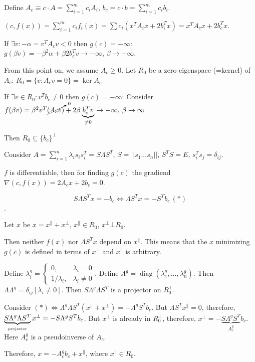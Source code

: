 \documentclass[a4paper]{article}
\DeclareMathOperator{\diag}{diag}
\begin{document}
Define $A_c\equiv c\cdot A=\sum\limits_{i=1}^m c_iA_i$, $b_c=c\cdot b=\sum\limits_{i=1}^m c_ib_i$.

$(c,f(x))=\sum\limits_{i=1}^m c_i f_i(x)=\sum c_i (x^TA_ix+2b_i^Tx)=x^TA_cx+2b_c^Tx$.

If $\exists v\colon -\alpha=v^TA_cv<0$ then $g(c)=-\infty$:
$g(\beta v)=-\beta^2\alpha+\beta 2b_c^Tv\to-\infty,\,\beta\to+\infty$.

From this point on, we assume $A_c\geqslant 0$. Let $R_0$ be a zero eigenspace (=kernel) of $A_c$: $R_0=\{v\colon A_cv=0\}=\ker A_c$

If $\exists v\in R_0\colon v^Tb_c\neq 0$ then $g(c)=-\infty$: Consider $f(\beta v)=\beta^2 v^T\cancelto{0}{(A_cv)}+2\beta \underbrace{b_c^Tv}_{\neq 0}\to-\infty,\, \beta\to\infty$

Then $R_0\subseteq \{b_c\}^\bot$

Consider $A=\sum\limits_{i=1}^n \lambda_i s_is_i^T=S\Lambda S^T$, $S=||s_1 ... s_n ||$, $S^TS=E$, $s_i^Ts_j=\delta_{ij}$.

$f$ is differentiable, then for finding $g(c)$ the gradiend $\nabla (c,f(x))=2A_cx+2b_c=0$.

$$S\Lambda S^Tx=-b_c\Leftrightarrow \Lambda S^Tx=-S^Tb_c\, (*)$$.

Let $x$ be $x=x^{\parallel}+x^\bot$, $x^{\parallel}\in R_0$, $x^\bot \bot R_0$.

Then neither $f(x)$ nor $\Lambda S^T x$ depend on $x^{\parallel}$. This means that the $x$ minimizing $g(c)$ is defined in terms of $x^{\bot}$ and $x^{\parallel}$ is arbitrary.

Define $\lambda^g_i=\begin{cases}
0,&\lambda_i=0\\
1/\lambda_i,&\lambda_i\neq 0
\end{cases}$. Define $\Lambda^g=\diag(\lambda^g_1,...,\lambda^g_n)$. Then $\Lambda \Lambda^g=\delta_{ij}[\lambda_i\neq 0]$. Then $S\Lambda^g\Lambda S^T$ is a projector on $R_0^\bot$.

Consider $(*) \Leftrightarrow \Lambda^g\Lambda S^T(x^\parallel+x^\bot)=-\Lambda^gS^Tb_c$. But $\Lambda S^Tx^\parallel=0$, therefore, $\underbrace{S\Lambda^g\Lambda S^T}_{\mbox{\tiny projector}}x^\bot=-S\Lambda^gS^Tb_c$. But $x^\bot$ is already in $R_0^\bot$, therefore, $x^\bot=-\underbrace{S\Lambda^gS^T}_{A^g_c}b_c$. Here $A_c^g$ is a pseudoinverse of $A_c$.

Therefore, $\boxed{x=-A_c^gb_c+x^\parallel}$, where $x^\parallel\in R_0$.

\end{document}
